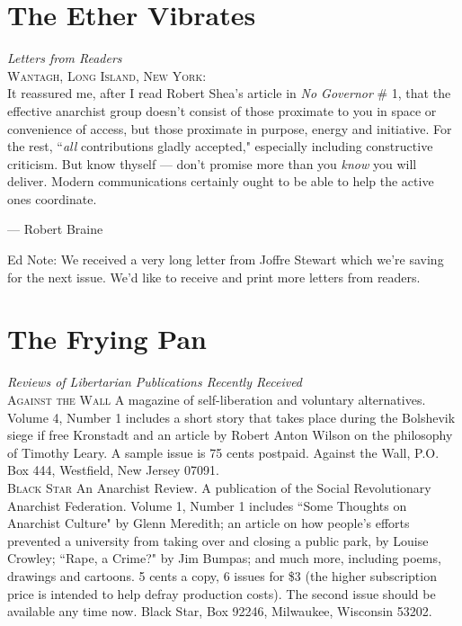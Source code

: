 \documentclass[12pt, onecolumn, letterpaper, oneside]{book}
\begin{document}
\chapter{The Ether Vibrates}
\vspace{-1cm}
\emph{Letters from Readers}\\

\noindent \textsc{Wantagh, Long Island, New York:}\\

It reassured me, after I read Robert Shea's article in \emph{No Governor} \# 1, that the effective anarchist group doesn't consist of those proximate to you in space or convenience of access, but those proximate in purpose, energy and initiative. For the rest, ``\emph{all} contributions gladly accepted," especially including constructive criticism. But know thyself --- don't promise more than you \emph{know} you will deliver. Modern communications certainly ought to be able to help the active ones coordinate.
\par\begin{flushright} --- Robert Braine\\ \end{flushright}

\noindent Ed Note: We received a very long letter from Joffre Stewart which we're saving for the next issue. We'd like to receive and print more letters from readers.




\chapter{The Frying Pan}
\vspace{-1cm}
\emph{Reviews of Libertarian Publications Recently Received}\\

\noindent\textsc{Against the Wall} A magazine of self-liberation and voluntary alternatives. Volume 4, Number 1 includes a short story that takes place during the Bolshevik siege if free Kronstadt and an article by Robert Anton Wilson on the philosophy of Timothy Leary. A sample issue is 75 cents postpaid. Against the Wall, P.O. Box 444, Westfield, New Jersey 07091.\\

\noindent\textsc{Black Star} An Anarchist Review. A publication of the Social Revolutionary Anarchist Federation. Volume 1, Number 1 includes ``Some Thoughts on Anarchist Culture" by Glenn Meredith; an article on how people's efforts prevented a university from taking over and closing a public park, by Louise Crowley; ``Rape, a Crime?" by Jim Bumpas; and much more, including poems, drawings and cartoons. 5 cents a copy, 6 issues for \$3 (the higher subscription price is intended to help defray production costs). The second issue should be available any time now. Black Star, Box 92246, Milwaukee, Wisconsin 53202.\\
\end{document}
